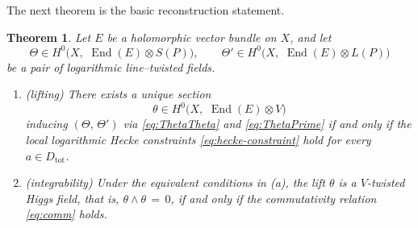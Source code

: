 \documentclass[a4paper,12pt]{amsart}
\numberwithin{equation}{section}
\newtheorem{theorem}{Theorem}[section]
\theoremstyle{definition}
\newcommand{\End}{\operatorname{End}}
\begin{document}
The next theorem is the basic reconstruction statement.

\begin{theorem}\label{thm:A}
Let \(E\) be a holomorphic vector bundle on \(X\), and let
\[
\Theta\in H^0\bigl(X,\,\, \End(E)\otimes S(P)\bigr),\qquad
\Theta'\in H^0\bigl(X,\,\, \End(E)\otimes L(P)\bigr)
\]
be a pair of logarithmic line--twisted fields.

\begin{enumerate}
\item[(a)] \textup{(lifting)} There exists a unique section
\[
\theta\in H^0\bigl(X,\,\, \End(E)\otimes V\bigr)
\]
inducing \((\Theta,\,\Theta')\) via \eqref{eq:ThetaTheta} and \eqref{eq:ThetaPrime} if and only if the local logarithmic Hecke constraints \eqref{eq:hecke-constraint} hold for every \(a\in D_{\mathrm{tot}}\).

\item[(b)] \textup{(integrability)} Under the equivalent conditions in \textup{(a)}, the lift \(\theta\) is a \(V\)-twisted Higgs field, that is, \(\theta\wedge\theta\,=\,0\), if and only if the commutativity relation \eqref{eq:comm} holds.
\end{enumerate}
\end{theorem}
\end{document}
